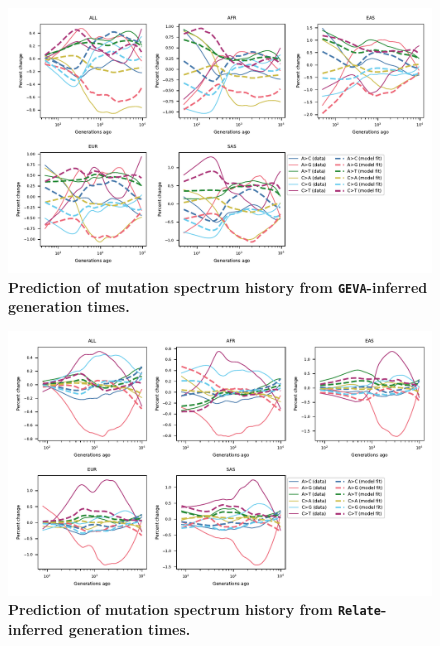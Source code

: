 \documentclass[]{article}
\newcommand{\GEVA}{\texttt{GEVA}\xspace}
\newcommand{\relate}{\texttt{Relate}\xspace}
\begin{document}
\begin{figure}[ht!]
    \centering
    \includegraphics[width=\textwidth]{../plots/goodness-of-fit.DM.geva.max_age.10000.pdf}
    \caption{
        \textbf{Prediction of mutation spectrum history from
        \GEVA-inferred generation times.}
    }
    \label{fig:geva-fit}
\end{figure}

\begin{figure}[ht!]
    \centering
    \includegraphics[width=\textwidth]{../plots/goodness-of-fit.DM.relate.max_age.10000.pdf}
    \caption{
        \textbf{Prediction of mutation spectrum history from
        \relate-inferred generation times.}
    }
    \label{fig:relate-fit}
\end{figure}
\end{document}

